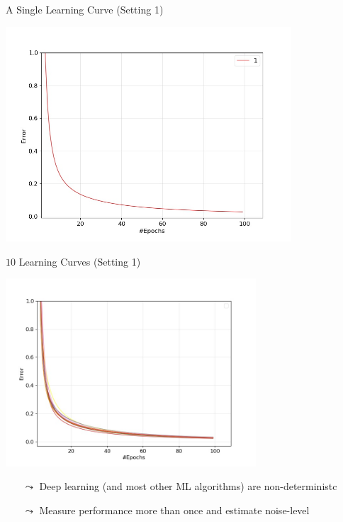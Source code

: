 \begin{frame}[c]{A Single Learning Curve (Setting 1)}

\centering
\includegraphics[width=0.8\textwidth]{scripts/one_learning_curve.jpg}


\end{frame}
\begin{frame}[c]{$10$ Learning Curves  (Setting 1)}

\centering
\includegraphics[width=0.7\textwidth]{scripts/ten_learning_curves.jpg}

\begin{itemize}
	\item[$\leadsto$] Deep learning (and most other ML algorithms) are non-deterministc
	\item[$\leadsto$] Measure performance more than once and estimate noise-level
\end{itemize}


\end{frame}
